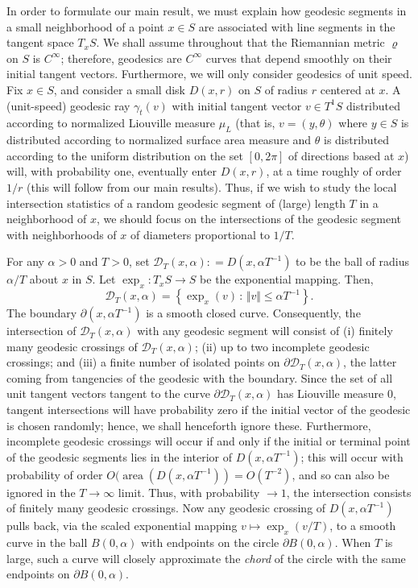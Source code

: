 \documentclass[10pt]{amsart}
\theoremstyle{definition}\newtheorem{defi}[theo]{Definition}\newtheorem{rema}[theo]{Remark}\newtheorem{exam}[theo]{Example}\newtheorem{exem}[theo]{Example}\newtheorem{nota}[theo]{Notation}
\newcommand{\xset}[1]{\left\{ #1 \right\}}
\newcommand{\xnorm}[1]{ \Vert #1 \Vert }
\newcommand{\D}{\mathcal{D}}
\DeclareMathOperator{\area}{area}
\begin{document}
In order to formulate our main result, we must explain how geodesic segments in a small neighborhood of a point $x \in S$ are associated with line segments in the tangent space $T_{x}S$. We shall assume throughout that the Riemannian metric $\varrho$ on $S$ is $C^{\infty}$; therefore, geodesics are $C^{\infty}$ curves that depend smoothly on their initial tangent vectors. Furthermore, we will only consider geodesics of unit speed. Fix $x \in S$, and consider a small disk $D (x,r)$ on $S$ of radius $r$ centered at $x$. A (unit-speed) geodesic ray $\gamma_{t}(v) $ with initial tangent vector $v\in T^{1}S$ distributed according to normalized Liouville measure $\mu_{L}$ (that is, $v=(y,\theta)$ where $y\in S$ is distributed according to normalized surface area measure and $\theta$ is distributed according to the uniform distribution on the set $[0, 2\pi]$ of directions based at $x$) will, with probability one, eventually enter $D (x,r)$, at a time roughly of order $1/r$ (this will follow from our main results). Thus, if we wish to study the local intersection statistics of a random geodesic segment of (large) length $T$ in a neighborhood of $x$, we should focus on the intersections of the geodesic segment with neighborhoods of $x$ of diameters proportional to $1/T$.

For any $\alpha>0$ and $T>0$, set $\D_T(x,\alpha) : = D(x, \alpha T^{-1})$ to be the ball of radius $\alpha/T$ about $x$ in $S$. Let $\exp_{x}:T_{x}S \rightarrow S$ be the exponential mapping. Then,
\begin{equation}\label{eq:alphaNH}
\D_T(x,\alpha) = \xset {\exp_{x}(v)\,:\, \xnorm{v}\leq\alpha T^{-1}}.
\end{equation}
The boundary $\partial (x, \alpha T^{-1})$ is a smooth closed curve. Consequently, the intersection of $\D_T(x, \alpha)$ with any geodesic segment will consist of (i) finitely many geodesic crossings of $\mathcal{D}_{T}(x,\alpha)$; (ii) up to two incomplete geodesic crossings; and (iii) a finite number of isolated points on $\partial \mathcal{D}_{T}(x,\alpha)$, the latter coming from tangencies of the geodesic with the boundary. Since the set of all unit tangent vectors tangent to the curve $\partial \mathcal{D}_{T}(x,\alpha)$ has Liouville measure $0$, tangent intersections will have probability zero if the initial vector of the geodesic is chosen randomly; hence, we shall henceforth ignore these. Furthermore, incomplete geodesic crossings will occur if and only if the initial or terminal point of the geodesic segments lies in the interior of $D(x, \alpha T^{-1})$; this will occur with probability of order $O(\area (D(x, \alpha T^{-1}))=O(T^{-2})$, and so can also be ignored in the $T\rightarrow \infty$ limit. Thus, with probability $\rightarrow 1$, the intersection consists of finitely many geodesic crossings. Now any geodesic crossing of $D(x, \alpha T^{-1})$ pulls back, via the scaled exponential mapping $v \mapsto \exp_{x}(v/T)$, to a smooth curve in the ball $B(0, \alpha)$ with endpoints on the circle $\partial B(0, \alpha)$. When $T$ is large, such a curve will closely approximate the \emph{chord} of the circle with the same endpoints on $\partial B(0, \alpha)$.
\end{document}
